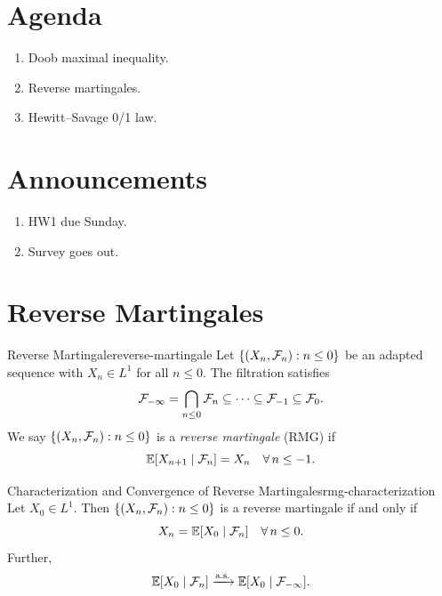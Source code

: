 
\section*{Agenda}
\begin{enumerate}
    \item Doob maximal inequality.
    \item Reverse martingales.
    \item Hewitt--Savage 0/1 law.
\end{enumerate}

\section*{Announcements}
\begin{enumerate}
    \item HW1 due Sunday.
    \item Survey goes out.
\end{enumerate}

\section{Reverse Martingales}

\begin{definition}{Reverse Martingale}{reverse-martingale}
    Let $\{(X_n, \mathcal{F}_n) : n \leq 0\}$ be an adapted sequence with $X_n \in L^1$ for all $n \leq 0$. The filtration satisfies
    \[
        \mathcal{F}_{-\infty} = \bigcap_{n \leq 0} \mathcal{F}_n \subseteq \cdots \subseteq \mathcal{F}_{-1} \subseteq \mathcal{F}_0.
    \]
    We say $\{(X_n, \mathcal{F}_n) : n \leq 0\}$ is a \emph{reverse martingale} (RMG) if
    \[
        \mathbb{E}[X_{n+1} \mid \mathcal{F}_n] = X_n \quad \forall\, n \leq -1.
    \]
\end{definition}

\begin{theorem}{Characterization and Convergence of Reverse Martingales}{rmg-characterization}
    Let $X_0 \in L^1$. Then $\{(X_n, \mathcal{F}_n) : n \leq 0\}$ is a reverse martingale if and only if
    \[
        X_n = \mathbb{E}[X_0 \mid \mathcal{F}_n] \quad \forall\, n \leq 0.
    \]
    Further,
    \[
        \mathbb{E}[X_0 \mid \mathcal{F}_n] \xrightarrow{\text{a.s.}} \mathbb{E}[X_0 \mid \mathcal{F}_{-\infty}].
    \]
\end{theorem}

